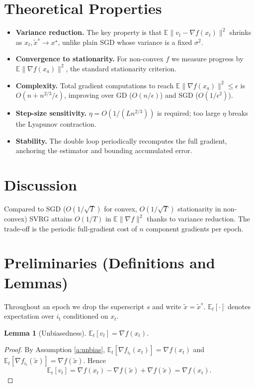 \documentclass[11pt]{article}
\newtheorem{lemma}{Lemma}
\begin{document}
\section*{Theoretical Properties}

\begin{itemize}
\item \textbf{Variance reduction.} The key property is that
$\mathbb{E}\|v_t - \nabla f(x_t)\|^2$ shrinks as $x_t,\tilde{x}^s \to x^\star$,
unlike plain SGD whose variance is a fixed $\sigma^2$.
\item \textbf{Convergence to stationarity.} For non-convex $f$ we measure progress by
$\mathbb{E}\|\nabla f(x_a)\|^2$, the standard stationarity criterion.
\item \textbf{Complexity.} Total gradient computations to reach
$\mathbb{E}\|\nabla f(x_a)\|^2 \le \epsilon$ is
$O(n + n^{2/3}/\epsilon)$, improving over GD ($O(n/\epsilon)$) and SGD ($O(1/\epsilon^2)$).
\item \textbf{Step-size sensitivity.} $\eta = O(1/(Ln^{2/3}))$ is required; too large $\eta$
breaks the Lyapunov contraction. 
\item \textbf{Stability.} The double loop periodically recomputes the full gradient,
anchoring the estimator and bounding accumulated error.
\end{itemize}

\section*{Discussion}

Compared to SGD ($O(1/\sqrt{T})$ for convex, $O(1/\sqrt{T})$ stationarity in non-convex)
SVRG attains $O(1/T)$ in $\mathbb{E}\|\nabla f\|^2$ thanks to variance reduction. The
trade-off is the periodic full-gradient cost of $n$ component gradients per epoch.

\section*{Preliminaries (Definitions and Lemmas)}

Throughout an epoch we drop the superscript $s$ and write $\tilde{x}=\tilde{x}^s$.
$\mathbb{E}_t[\cdot]$ denotes expectation over $i_t$ conditioned on $x_t$.

\begin{lemma}[Unbiasedness]\label{lem:unbias}
$\mathbb{E}_t[v_t] = \nabla f(x_t)$.
\end{lemma}
\begin{proof}
By Assumption \ref{a:unbias},
$\mathbb{E}_t[\nabla f_{i_t}(x_t)]=\nabla f(x_t)$ and
$\mathbb{E}_t[\nabla f_{i_t}(\tilde{x})]=\nabla f(\tilde{x})$. Hence
\[
\mathbb{E}_t[v_t] = \nabla f(x_t) - \nabla f(\tilde{x}) + \nabla f(\tilde{x}) = \nabla f(x_t).
\tag*{[Step 1]}
\]
\end{proof}
\end{document}
